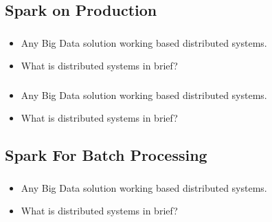 \subsection{Spark on Production}

\begin{frame}
  \frametitle{\subsecname}
	\begin{itemize} 
		\item Any Big Data solution working based distributed systems.
		\item What is distributed systems in brief?
	\end{itemize}
\end{frame}


\begin{frame}
  \frametitle{\subsecname}
	\begin{itemize} 
		\item Any Big Data solution working based distributed systems.
		\item What is distributed systems in brief?
	\end{itemize}
\end{frame}


\subsection{Spark For Batch Processing}

\begin{frame}
  \frametitle{\subsecname}
	\begin{itemize} 
		\item Any Big Data solution working based distributed systems.
		\item What is distributed systems in brief?
	\end{itemize}
\end{frame}

